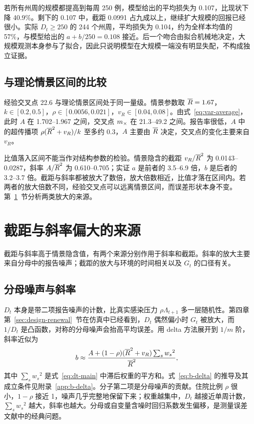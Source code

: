若所有州周的规模都提高到每周 250 例，模型给出的平均损失为 0.107，比现状下降 40.9\%。剩下的 0.107 中，截距 0.0991 占九成以上，继续扩大规模的回报已经很小。实际 $D_t\geq250$ 的 244 个州周，平均损失为 0.104，约为全样本均值的 57\%，与模型给出的 $a+b/250=0.108$ 接近。后一个吻合由拟合机械地决定，大规模观测本身参与了拟合，因此只说明模型在大规模一端没有明显失配，不构成独立证据。

\subsection{与理论情景区间的比较}

经验交叉点 22.6 与理论情景区间处于同一量级。情景参数取 $\overline{R}=1.67$，$k\in[0.2,0.5]$\citep{lloydsmith2005superspreading}，$\rho\in[0.0056,0.021]$\citep{zhou2012hospitalizations, tokars2018seasonal}，$v_R\in[0.04,0.08]$。由式~\eqref{eq:var-average}，此时 $A$ 在 1.702--1.967 之间，交叉点 $m_{\times}$ 在 21.3--49.2 之间。报告率很低，$A$ 中的超传播项 $\rho(\overline{R}^2+v_R)/k$ 至多约 0.3，$A$ 主要由 $\overline{R}$ 决定，交叉点的变化主要来自 $v_R$。

比值落入区间不能当作对结构参数的检验。情景隐含的截距 $v_R/\overline{R}^2$ 为 0.0143--0.0287，斜率 $A/\overline{R}^2$ 为 0.610--0.705；实证 $a$ 是前者的 3.5--6.9 倍，$b$ 是后者的 3.2--3.7 倍。截距与斜率都被放大了数倍，放大倍数相近，比值才落在区间内。若两者的放大倍数不同，经验交叉点可以远离情景区间，而误差形状本身不变。第~\ref{sec:emp-inflation}~节分析两类放大的来源。

\section{截距与斜率偏大的来源}
\label{sec:emp-inflation}

截距与斜率高于情景隐含值，有两个来源分别作用于斜率和截距。斜率的放大主要来自分母中的报告噪声；截距的放大与环境的时间相关以及 $G_t$ 的口径有关。

\subsection{分母噪声与斜率}

$D_t$ 本身是带二项报告噪声的计数，比真实感染压力 $\rho\Lambda_{t+1}$ 多一层随机性。第四章第~\ref{sec:design-renewal}~节在仿真中已经看到，$D_t$ 偶然偏小时 $G_t$ 被放大，而 $1/D_t$ 是凸函数，对称的分母噪声会抬高平均误差。用 delta 方法展开到 $1/m$ 阶，斜率近似为
\begin{equation}
  b\approx\frac{A+(1-\rho)(\overline{R}^2+v_R)\sum_s {w_s}^2}{\overline{R}^2},
  \label{eq:b-delta}
\end{equation}
其中 $\sum_s {w_s}^2$ 是式~\eqref{eq:dt-main} 中滞后权重的平方和。式~\eqref{eq:b-delta} 的推导及其成立条件见附录~\ref{app:b-delta}。分子第二项是分母噪声的贡献。住院比例 $\rho$ 很小，$1-\rho$ 接近 1，噪声几乎完整地保留下来；权重越集中，$D_t$ 越接近单周计数，$\sum_s {w_s}^2$ 越大，斜率也越大。分母或自变量含噪时回归系数发生偏移，是测量误差文献中的经典问题\citep{fuller1987measurement, carroll2006measurement}。

